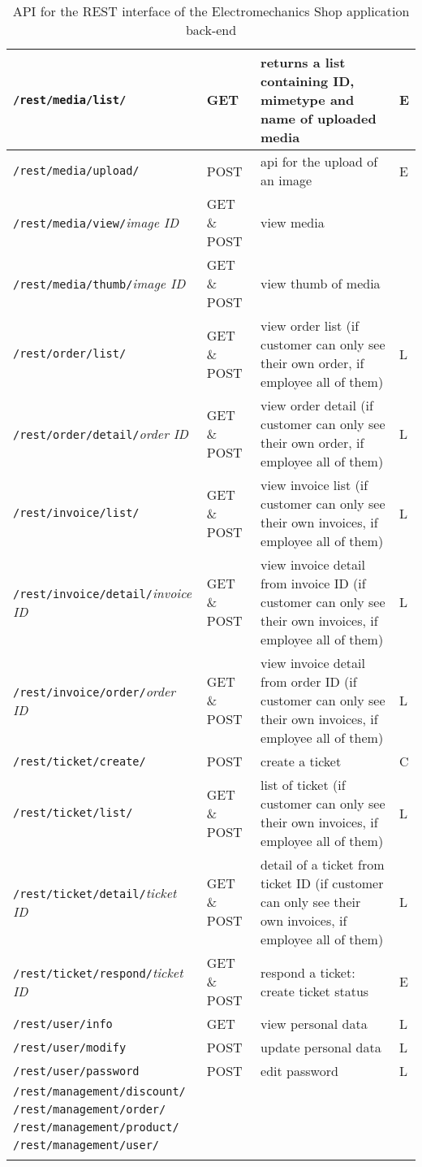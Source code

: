 \begin{longtable}{|p{}|p{} |p{}|p{}|}
\texttt{/rest/media/list/} & GET & returns a list containing ID, mimetype and name of uploaded media & E\\\hline
\texttt{/rest/media/upload/} & POST &  api for the upload of an image & E\\\hline
\texttt{/rest/media/view/}\textit{image ID} & GET \& POST &  view media &  \\\hline
\texttt{/rest/media/thumb/}\textit{image ID} & GET \& POST & view thumb of media &  \\\hline
\texttt{/rest/order/list/} & GET \& POST & view order list (if customer can only see their own order, if employee all of them) & L\\\hline
\texttt{/rest/order/detail/}\textit{order ID} & GET \& POST & view order detail (if customer can only see their own order, if employee all of them) & L\\\hline
\texttt{/rest/invoice/list/} & GET \& POST & view invoice list (if customer can only see their own invoices, if employee all of them) & L\\\hline
\texttt{/rest/invoice/detail/}\textit{invoice ID} & GET \& POST & view invoice detail from invoice ID (if customer can only see their own invoices, if employee all of them) & L\\\hline
\texttt{/rest/invoice/order/}\textit{order ID} & GET \& POST & view invoice detail from order ID (if customer can only see their own invoices, if employee all of them) & L\\\hline
\texttt{/rest/ticket/create/} & POST  & create a ticket & C \\\hline
\texttt{/rest/ticket/list/} & GET \& POST  & list of ticket (if customer can only see their own invoices, if employee all of them) & L \\\hline
\texttt{/rest/ticket/detail/}\textit{ticket ID} & GET \& POST & detail of a ticket from ticket ID (if customer can only see their own invoices, if employee all of them) & L \\\hline
\texttt{/rest/ticket/respond/}\textit{ticket ID} & GET \& POST & respond a ticket: create ticket status & E \\\hline
\texttt{/rest/user/info} & GET & view personal data & L \\\hline
\texttt{/rest/user/modify} & POST & update personal data & L\\\hline
\texttt{/rest/user/password} & POST & edit password & L\\\hline
\texttt{/rest/management/discount/} & & &\\\hline
\texttt{/rest/management/order/} & & &\\\hline
\texttt{/rest/management/product/} & & &\\\hline
\texttt{/rest/management/user/} & & &\\\hline

\caption{API for the REST interface of the Electromechanics
Shop application back-end}
\label{tab:ApiRest}
\end{longtable}